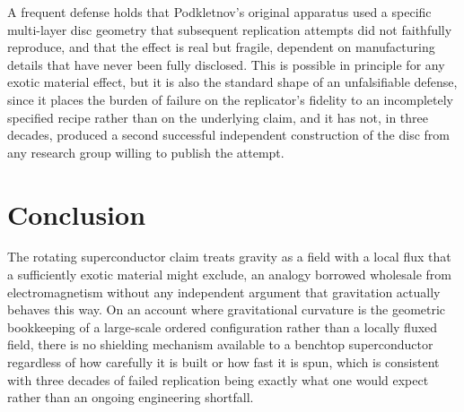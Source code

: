 \documentclass[11pt]{article}
\begin{document}
A frequent defense holds that Podkletnov's original apparatus used a specific multi-layer disc geometry that subsequent replication attempts did not faithfully reproduce, and that the effect is real but fragile, dependent on manufacturing details that have never been fully disclosed. This is possible in principle for any exotic material effect, but it is also the standard shape of an unfalsifiable defense, since it places the burden of failure on the replicator's fidelity to an incompletely specified recipe rather than on the underlying claim, and it has not, in three decades, produced a second successful independent construction of the disc from any research group willing to publish the attempt.

\section{Conclusion}

The rotating superconductor claim treats gravity as a field with a local flux that a sufficiently exotic material might exclude, an analogy borrowed wholesale from electromagnetism without any independent argument that gravitation actually behaves this way. On an account where gravitational curvature is the geometric bookkeeping of a large-scale ordered configuration rather than a locally fluxed field, there is no shielding mechanism available to a benchtop superconductor regardless of how carefully it is built or how fast it is spun, which is consistent with three decades of failed replication being exactly what one would expect rather than an ongoing engineering shortfall.
\end{document}
